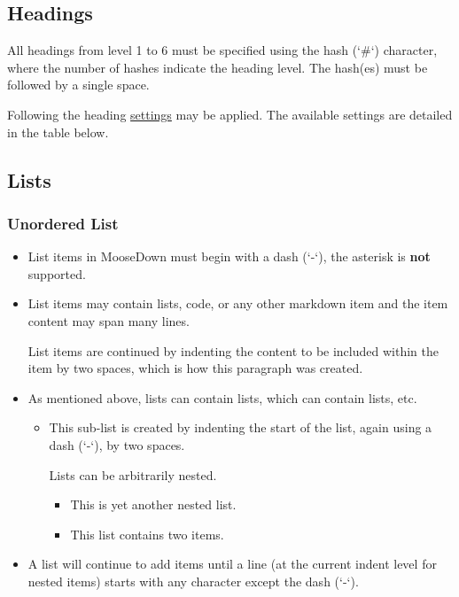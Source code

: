 \documentclass{book}
\begin{document}
\subsection{\label{headings}Headings}
\par
All headings from level 1 to 6 must be specified using the hash (`\#`) character, where the number of hashes indicate the heading level. The hash(es) must be followed by a single space.
\par
Following the heading \href{settings}{settings} may be applied. The available settings are detailed in the table below.
\subsection{\label{lists}Lists}
\subsubsection{\label{unordered-list}Unordered List}
\begin{itemize}
\item
\par
List items in MooseDown must begin with a dash (`-`), the asterisk is \textbf{not} supported. 
\item
\par
List items may contain lists, code, or any other markdown item and the item content may span many lines.
\par
List items are continued by indenting the content to be included within the item by two spaces, which is how this paragraph was created.
\item
\par
As mentioned above, lists can contain lists, which can contain lists, etc.
\begin{itemize}
\item
\par
This sub-list is created by indenting the start of the list, again using a dash (`-`), by two spaces.
\par
Lists can be arbitrarily nested.
\begin{itemize}
\item
\par
This is yet another nested list. 
\item
\par
This list contains two items.
\end{itemize}
\end{itemize}
\item
\par
A list will continue to add items until a line (at the current indent level for nested items) starts with any character except the dash (`-`).
\end{itemize}
\end{document}
